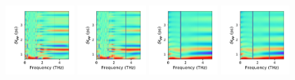 \documentclass[a4paper]{article}
\begin{document}
\begin{figure}[H]
  \centering
  \includegraphics[width=0.23\textwidth]{cond_pcolor-A2-v5-imp0.pdf}
  \includegraphics[width=0.23\textwidth]{cond_pcolor-A2-v5-imp1.pdf}
  \includegraphics[width=0.23\textwidth]{cond_pcolor-A2-v5-imp2.pdf}
  \includegraphics[width=0.23\textwidth]{cond_pcolor-A2-v5-imp3.pdf}
\end{figure}
\end{document}
